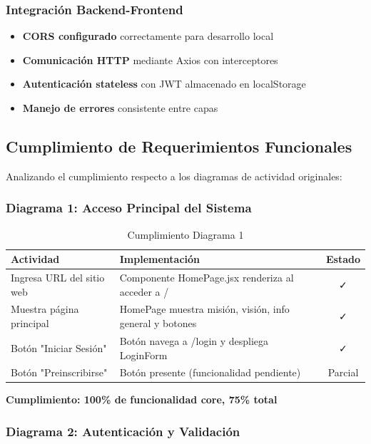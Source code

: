 \documentclass[11pt,a4paper]{article}
\begin{document}
\subsubsection{Integración Backend-Frontend}

\begin{itemize}
    \item \textbf{CORS configurado} correctamente para desarrollo local
    \item \textbf{Comunicación HTTP} mediante Axios con interceptores
    \item \textbf{Autenticación stateless} con JWT almacenado en localStorage
    \item \textbf{Manejo de errores} consistente entre capas
\end{itemize}

\subsection{Cumplimiento de Requerimientos Funcionales}

Analizando el cumplimiento respecto a los diagramas de actividad originales:

\subsubsection{Diagrama 1: Acceso Principal del Sistema}

\begin{table}[H]
\centering
\begin{tabularx}{\textwidth}{|l|X|c|}
\hline
\rowcolor{gray!20}
\textbf{Actividad} & \textbf{Implementación} & \textbf{Estado} \\
\hline
Ingresa URL del sitio web & Componente HomePage.jsx renderiza al acceder a / & ✓ \\
\hline
Muestra página principal & HomePage muestra misión, visión, info general y botones & ✓ \\
\hline
Botón "Iniciar Sesión" & Botón navega a /login y despliega LoginForm & ✓ \\
\hline
Botón "Preinscribirse" & Botón presente (funcionalidad pendiente) & Parcial \\
\hline
\end{tabularx}
\caption{Cumplimiento Diagrama 1}
\end{table}

\textbf{Cumplimiento: 100\% de funcionalidad core, 75\% total}

\subsubsection{Diagrama 2: Autenticación y Validación}
\end{document}
